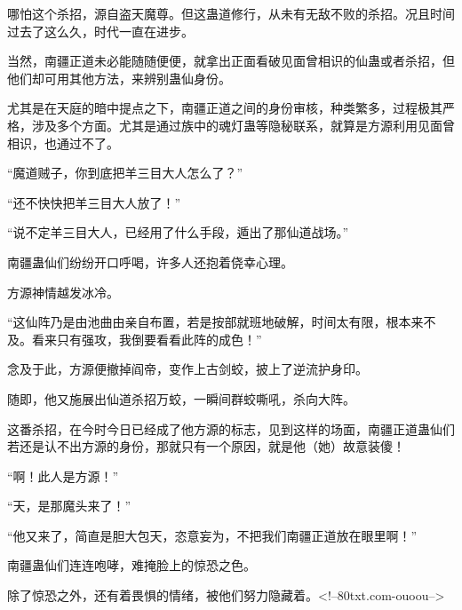 \begin{this_body}
哪怕这个杀招，源自盗天魔尊。但这蛊道修行，从未有无敌不败的杀招。况且时间过去了这么久，时代一直在进步。

当然，南疆正道未必能随随便便，就拿出正面看破见面曾相识的仙蛊或者杀招，但他们却可用其他方法，来辨别蛊仙身份。

尤其是在天庭的暗中提点之下，南疆正道之间的身份审核，种类繁多，过程极其严格，涉及多个方面。尤其是通过族中的魂灯蛊等隐秘联系，就算是方源利用见面曾相识，也通过不了。

“魔道贼子，你到底把羊三目大人怎么了？”

“还不快快把羊三目大人放了！”

“说不定羊三目大人，已经用了什么手段，遁出了那仙道战场。”

南疆蛊仙们纷纷开口呼喝，许多人还抱着侥幸心理。

方源神情越发冰冷。

“这仙阵乃是由池曲由亲自布置，若是按部就班地破解，时间太有限，根本来不及。看来只有强攻，我倒要看看此阵的成色！”

念及于此，方源便撤掉阎帝，变作上古剑蛟，披上了逆流护身印。

随即，他又施展出仙道杀招万蛟，一瞬间群蛟嘶吼，杀向大阵。

这番杀招，在今时今日已经成了他方源的标志，见到这样的场面，南疆正道蛊仙们若还是认不出方源的身份，那就只有一个原因，就是他（她）故意装傻！

“啊！此人是方源！”

“天，是那魔头来了！”

“他又来了，简直是胆大包天，恣意妄为，不把我们南疆正道放在眼里啊！”

南疆蛊仙们连连咆哮，难掩脸上的惊恐之色。

除了惊恐之外，还有着畏惧的情绪，被他们努力隐藏着。<!--80txt.com-ouoou-->

\end{this_body}

